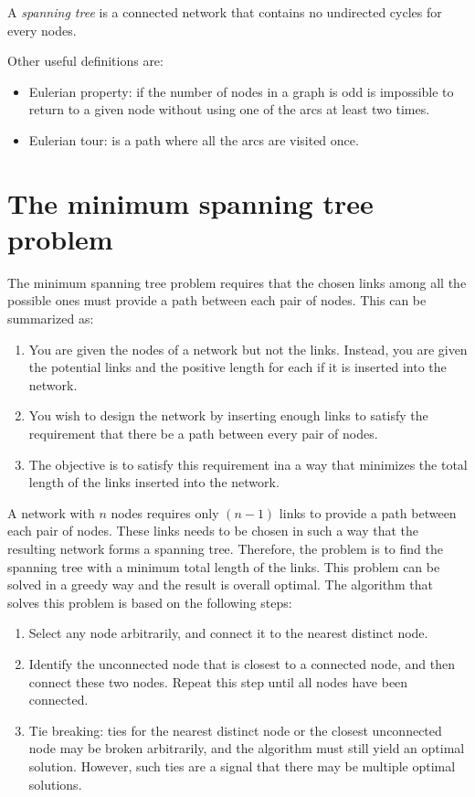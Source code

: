 \documentclass[12pt, a4paper]{report}
\newtheorem[style=M,bodystyle=\normalfont]{theorem}{Theorem}
\newtheorem[style=M,bodystyle=\normalfont]{corollary}{Corollary}
\newtheorem[style=M,bodystyle=\normalfont]{lemma}{Lemma}
\newtheorem[style=M,bodystyle=\normalfont]{definition}{Definition}
\begin{document}
\begin{remark}
    A \emph{spanning tree} is a connected network that contains no undirected cycles for every nodes.
\end{remark}
Other useful definitions are: 
\begin{itemize}
    \item Eulerian property: if the number of nodes in a graph is odd is impossible to return to a given node without using one of the 
    arcs at least two times. 
    \item Eulerian tour: is a path where all the arcs are visited once.
\end{itemize}
\section{The minimum spanning tree problem}
The minimum spanning tree problem requires that the chosen links among all the possible ones must provide a path between each pair of nodes.
This can be summarized as: 
\begin{enumerate}
    \item You are given the nodes of a network but not the links. Instead, you are given the potential links and the positive length
    for each if it is inserted into the network. 
    \item You wish to design the network by inserting enough links to satisfy the requirement that there be a path between every pair of nodes.
    \item The objective is to satisfy this requirement ina a way that minimizes the total length of the links inserted into the network. 
\end{enumerate}
A network with $n$ nodes requires only $(n-1)$ links to provide a path between each pair of nodes. These links needs to be chosen in such 
a way that the resulting network forms a spanning tree. Therefore, the problem is to find the spanning tree with a minimum total length of
the links. This problem can be solved in a greedy way and the result is overall optimal. The algorithm that solves this problem is based on
the following steps: 
\begin{enumerate}
    \item Select any node arbitrarily, and connect it to the nearest distinct node. 
    \item Identify the unconnected node that is closest to a connected node, and then connect these two nodes. Repeat this step until all
    nodes have been connected.
    \item Tie breaking: ties for the nearest distinct node or the closest unconnected node may be broken arbitrarily, and the algorithm
    must still yield an optimal solution. However, such ties are a signal that there may be multiple optimal solutions.
\end{enumerate}
\end{document}
